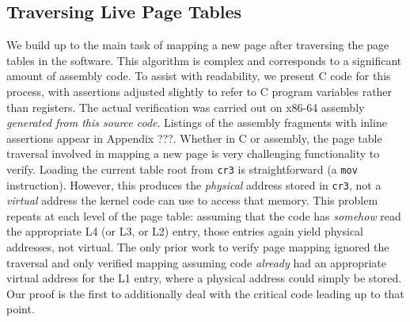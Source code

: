 \subsection{Traversing Live Page Tables}
\label{sec:traversing}
We build up to the main task of mapping a new page after traversing the page tables in the software.
This algorithm is complex and corresponds to a significant amount of assembly code.
To assist with readability, we present C code for this process, with assertions adjusted slightly to refer to
C program variables rather than registers. The actual verification was carried out on x86-64 assembly
\emph{generated from this source code}.
Listings of the assembly fragments with inline assertions appear in Appendix ???. %
Whether in C or assembly,
the page table traversal involved in mapping a new page is very challenging functionality to verify.
Loading the current table root from \lstinline|cr3| is straightforward (a \lstinline|mov| instruction).
However, this produces the \emph{physical} address stored in \lstinline|cr3|, not a \emph{virtual} address the kernel code can use to access that memory.
This problem repeats at each level of the page table: assuming that the code has \emph{somehow} read the appropriate L4 (or L3, or L2) entry, those entries again
yield physical addresses, not virtual.
The only prior work to verify page mapping ignored the traversal and only verified mapping
assuming code \emph{already} had an appropriate virtual address for the L1 entry, where a physical
address could simply be stored. Our proof is the first to additionally deal with the critical code
leading up to that point.

